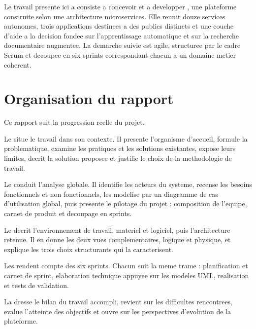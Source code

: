 Le travail presente ici a consiste a concevoir et a developper
\sujetCourt, une plateforme construite selon une architecture
microservices. Elle reunit douze services autonomes, trois applications
destinees a des publics distincts et une couche d'aide a la decision
fondee sur l'apprentissage automatique et sur la recherche documentaire
augmentee. La demarche suivie est agile, structuree par le cadre Scrum
et decoupee en six sprints correspondant chacun a un domaine metier
coherent.

\section*{Organisation du rapport}

Ce rapport suit la progression reelle du projet.

Le  situe le travail dans son contexte. Il
presente l'organisme d'accueil, formule la problematique, examine les
pratiques et les solutions existantes, expose leurs limites, decrit la
solution proposee et justifie le choix de la methodologie de travail.

Le  conduit l'analyse globale. Il identifie
les acteurs du systeme, recense les besoins fonctionnels et non
fonctionnels, les modelise par un diagramme de cas d'utilisation global,
puis presente le pilotage du projet : composition de l'equipe, carnet de
produit et decoupage en sprints.

Le  decrit l'environnement de travail,
materiel et logiciel, puis l'architecture retenue. Il en donne les deux
vues complementaires, logique et physique, et explique les trois choix
structurants qui la caracterisent.

Les  rendent compte des six sprints.
Chacun suit la meme trame : planification et carnet de sprint,
elaboration technique appuyee sur les modeles UML, realisation et tests
de validation.

La  dresse le bilan du travail accompli,
revient sur les difficultes rencontrees, evalue l'atteinte des objectifs
et ouvre sur les perspectives d'evolution de la plateforme.
